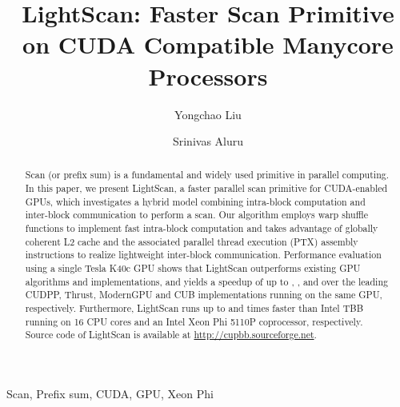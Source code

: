\documentclass[article]{elsarticle}
\renewcommand{\hl}[1]{#1}
\begin{document}
\begin{frontmatter}
\title{LightScan: Faster Scan Primitive on CUDA Compatible Manycore Processors}

\author{Yongchao Liu}
\author{Srinivas Aluru}

\address{School of Computational Science \& Engineering\\
 Georgia Institute of Technology\\Atlanta, USA}


\begin{abstract}
Scan (or prefix sum) is a fundamental and widely used primitive in parallel computing. In this paper, we present LightScan, a faster parallel scan primitive for CUDA-enabled GPUs, which investigates a hybrid model combining intra-block computation and inter-block communication to perform a scan. Our algorithm employs warp shuffle functions to implement fast intra-block computation and takes advantage of globally coherent L2 cache and the associated parallel thread execution (PTX) assembly instructions to realize lightweight inter-block communication. Performance evaluation using a single Tesla K40c GPU shows that LightScan outperforms existing GPU algorithms and implementations, and yields a speedup of up to , ,  and  over the leading CUDPP, Thrust, ModernGPU and CUB implementations running on the same GPU, respectively. Furthermore, LightScan runs up to  and  times faster than Intel TBB running on 16 CPU cores and an Intel Xeon Phi 5110P coprocessor, respectively. \hl{Source code of LightScan is available at \url{http://cupbb.sourceforge.net}.}
\end{abstract}

\begin{keyword}
Scan, Prefix sum, CUDA, GPU, Xeon Phi
\end{keyword}
\end{frontmatter}
\end{document}
